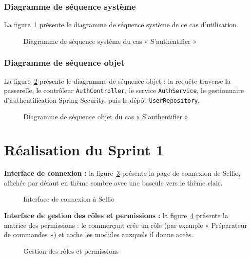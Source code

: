 \subsubsection{Diagramme de séquence système}
La figure~\ref{fig:dss-login} présente le diagramme de séquence système de ce cas d'utilisation.
\begin{figure}[H]
    \centering
    \caption{Diagramme de séquence système du cas « S'authentifier »}
    \label{fig:dss-login}
\end{figure}

\subsubsection{Diagramme de séquence objet}
La figure~\ref{fig:dso-login} présente le diagramme de séquence objet : la requête traverse la passerelle, le contrôleur \texttt{AuthController}, le service \texttt{AuthService}, le gestionnaire d'authentification Spring Security, puis le dépôt \texttt{UserRepository}.
\begin{figure}[H]
    \centering
    \caption{Diagramme de séquence objet du cas « S'authentifier »}
    \label{fig:dso-login}
\end{figure}

\section{Réalisation du Sprint 1}
\textbf{Interface de connexion :} la figure~\ref{fig:ui-login} présente la page de connexion de Sellio, affichée par défaut en thème sombre avec une bascule vers le thème clair.
\begin{figure}[H]
    \centering
    \caption{Interface de connexion à Sellio}
    \label{fig:ui-login}
\end{figure}

\textbf{Interface de gestion des rôles et permissions :} la figure~\ref{fig:ui-roles} présente la matrice des permissions : le commerçant crée un rôle (par exemple « Préparateur de commandes ») et coche les modules auxquels il donne accès.
\begin{figure}[H]
    \centering
    \caption{Gestion des rôles et permissions}
    \label{fig:ui-roles}
\end{figure}


